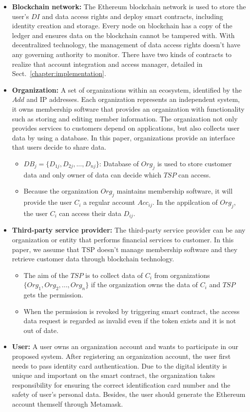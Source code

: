     \begin{itemize}
        \item \textbf{Blockchain network:} The Ethereum blockchain network is used to store the user's \(DI\) and data access rights and deploy smart contracts, including identity creation and storage. Every node on blockchain has a copy of the ledger and ensures data on the blockchain cannot be tampered with. With decentralized technology, the management of data access rights doesn't have any governing authority to monitor. There have two kinds of contracts to realize that account integration and access manager, detailed in Sect.~\ref{chapter:implementation}.  
        \item \textbf{Organization:} A set of organizations within an ecosystem, identified by the \(Add\) and IP addresses. Each organization represents an independent system, it owns membership software that provides an organization with functionality such as storing and editing member information. The organization not only provides services to customers depend on applications, but also collects user data by using a database. In this paper, organizations provide an interface that users decide to share data.
        \begin{itemize}
            \item $DB_j = \{D_{1j}, D_{2j}, ..., D_{nj}\}$: Database of $Org_j$ is used to store customer data and only owner of data can decide which $TSP$ can access. 
            \item Because the organization $Org_j$ maintains membership software, it will provide the user $C_i$ a regular account $Acc_{ij}$. In the appilcation of $Org_j$, the user $C_i$ can access their data $D_{ij}$.
        \end{itemize}
        \item \textbf{Third-party service provider:} The third-party service provider can be any organization or entity that performs financial services to customer. In this paper, we assume that TSP doesn't manage membership software and they retrieve customer data through blockchain technology.
        \begin{itemize}
            \item The aim of the $TSP$ is to collect data of $C_i$ from organizations $\{Org_1, Org_2, ..., Org_n\}$ if the organization owns the data of $C_i$ and $TSP$ gets the permission.
            \item When the permission is revoked by triggering smart contract, the access data request is regarded as invalid even if the token exists and it is not out of date.
        \end{itemize}
        \item \textbf{User:} A user owns an organization account and wants to participate in our proposed system. After registering an organization account, the user first needs to pass identity card authentication. Due to the digital identity is unique and important on the smart contract, the organization takes responsibility for ensuring the correct identification card number and the safety of user's personal data. Besides, the user should generate the Ethereum account themself through Metamask.
    \end{itemize}

